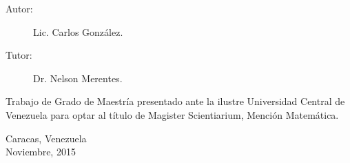\begin{titlepage}
\begin{large}
\vspace{1cm}

\begin{description}
\item[Autor:] Lic. Carlos Gonz\'alez.
\item[Tutor:] Dr. Nelson Merentes.
\end{description}

\begin{flushright}
\begin{minipage}[b][5cm][b]{0,45\textwidth}
Trabajo de Grado de Maestría presentado
ante la ilustre Universidad Central de 
Venezuela para optar al título de Magister
Scientiarium, Mención Matemática.
\end{minipage}
\end{flushright}

\begin{center}

Caracas, Venezuela \\ Noviembre, 2015

\end{center}

\end{large}

\end{titlepage}

%
%
%
%
%
%
%
%
%
%
%
%
%
%
%

